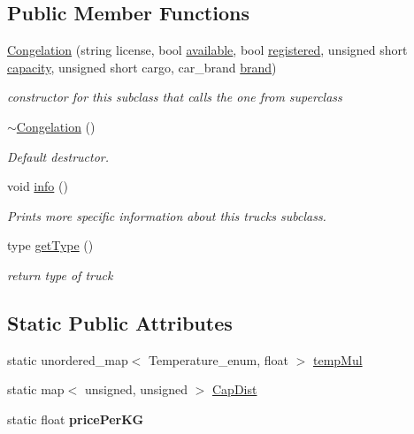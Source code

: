 \subsection*{Public Member Functions}
\begin{DoxyCompactItemize}
\item 
\hyperlink{class_congelation_a2c2b118a9550c2912b35fb85dd1594fb}{Congelation} (string license, bool \hyperlink{class_truck_a4189fe5ed32f6084459a9c5ae1eb7c2a}{available}, bool \hyperlink{class_truck_a80b8405cf7a15b236fef70116f99c4fb}{registered}, unsigned short \hyperlink{class_truck_ab004524786ae7aebf7c7bdb5e1599696}{capacity}, unsigned short cargo, car\+\_\+brand \hyperlink{class_truck_a4e30b27a9898eba7ac8404d25cbdd265}{brand})
\begin{DoxyCompactList}\small\item\em constructor for this subclass that calls the one from superclass \end{DoxyCompactList}\item 
\hyperlink{class_congelation_a7aa24e7127ec7c1d9d01043b665ae66f}{$\sim$\+Congelation} ()
\begin{DoxyCompactList}\small\item\em Default destructor. \end{DoxyCompactList}\item 
void \hyperlink{class_congelation_ac2f7cb9aeeeb9428a9a973e6a2c63942}{info} ()
\begin{DoxyCompactList}\small\item\em Prints more specific information about this truck\textquotesingle{}s subclass. \end{DoxyCompactList}\item 
type \hyperlink{class_congelation_a5026bd6791faeae03fbf1ad84f9bbc08}{get\+Type} ()
\begin{DoxyCompactList}\small\item\em return type of truck \end{DoxyCompactList}\end{DoxyCompactItemize}
\subsection*{Static Public Attributes}
\begin{DoxyCompactItemize}
\item 
static unordered\+\_\+map$<$ Temperature\+\_\+enum, float $>$ \hyperlink{class_congelation_aa0cf9fa825aa450ff04d58e5e733706b}{temp\+Mul}
\item 
static map$<$ unsigned, unsigned $>$ \hyperlink{class_congelation_aaa0f7881a3e1e58c35176bdd22e27425}{Cap\+Dist}
\item 
\mbox{\label{class_congelation_ab30061aebb6a0fa59ec3f40e9de0ca34}} 
static float {\bfseries price\+Per\+KG}
\end{DoxyCompactItemize}
